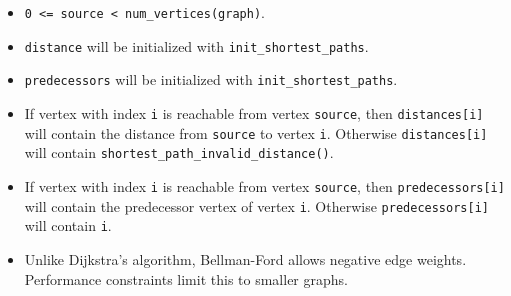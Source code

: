 {\small
      
      
}



\begin{itemdescr}
      \pnum\preconditions
            \begin{itemize}
                  \item
                        \lstinline{0 <= source < num_vertices(graph)}. 
                  \item
                        \lstinline{distance} will be initialized with \lstinline{init_shortest_paths}.
                  \item
                        \lstinline{predecessors} will be initialized with \lstinline{init_shortest_paths}.
            \end{itemize}
      \pnum\effects
            \begin{itemize}
                  \item
                        If vertex with index \lstinline{i} is reachable from vertex \lstinline{source}, then
                        \lstinline{distances[i]} will contain the distance from \lstinline{source} to vertex
                        \lstinline{i}.  Otherwise \lstinline{distances[i]} will contain
                        \lstinline{shortest_path_invalid_distance()}.
                  \item
                        If vertex with index \lstinline{i} is reachable
                        from vertex \lstinline{source}, then \lstinline{predecessors[i]} will contain the
                        predecessor vertex of vertex \lstinline{i}. Otherwise \lstinline{predecessors[i]} will contain
                        \lstinline{i}.
            \end{itemize}
      \pnum\remarks 
            \begin{itemize}
                  \item
                        Unlike Dijkstra's algorithm, Bellman-Ford allows negative edge weights. Performance constraints limit this to smaller graphs.
            \end{itemize}
\end{itemdescr}


